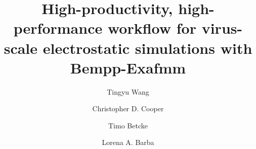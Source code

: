 \documentclass[final,5p,times,twocolumn]{elsarticle}
\begin{document}
\begin{frontmatter}
\title{High-productivity, high-performance workflow for virus-scale electrostatic simulations with Bempp-Exafmm}

\author[gwu]{Tingyu Wang}

\author[usm]{Christopher D. Cooper}

\author[ucl]{Timo Betcke}

\author[gwu]{Lorena A. Barba}

\address[gwu]{Department of Mechanical and Aerospace Engineering, The George Washington University, Washington DC}
\address[usm]{Department of Mechanical Engineering and Centro Cient\'ifico Tecnol\'ogico de Valpara\'iso, Universidad T\'ecnica Federico Santa Mar\'ia, Valpara\'iso, Chile}
\address[ucl]{Department of Mathematics, University College London, UK}


\end{frontmatter}
\end{document}
